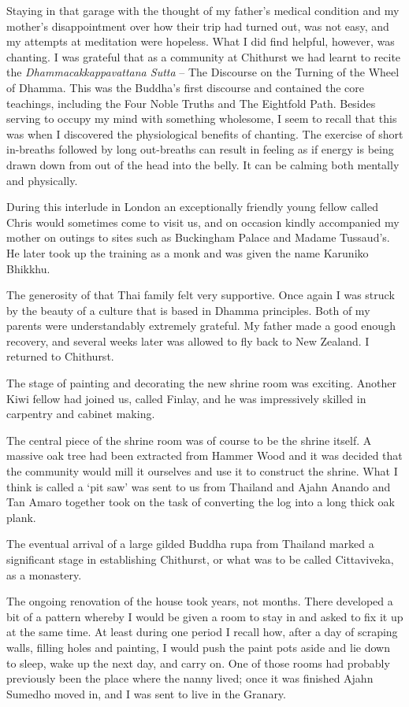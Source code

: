 Staying in that garage with the thought of my father's medical condition
and my mother's disappointment over how their trip had turned out, was
not easy, and my attempts at meditation were hopeless. What I did find
helpful, however, was chanting. I was grateful that as a community at
Chithurst we had learnt to recite the \emph{Dhammacakkappavattana Sutta}
-- The Discourse on the Turning of the Wheel of Dhamma. This was the
Buddha's first discourse and contained the core teachings, including the
Four Noble Truths and The Eightfold Path. Besides serving to occupy my
mind with something wholesome, I seem to recall that this was when I
discovered the physiological benefits of chanting. The exercise of short
in-breaths followed by long out-breaths can result in feeling as if
energy is being drawn down from out of the head into the belly. It can
be calming both mentally and physically.

During this interlude in London an exceptionally friendly young fellow
called Chris would sometimes come to visit us, and on occasion kindly
accompanied my mother on outings to sites such as Buckingham Palace and
Madame Tussaud's. He later took up the training as a monk and was given
the name Karuniko Bhikkhu.

The generosity of that Thai family felt very supportive. Once again I
was struck by the beauty of a culture that is based in Dhamma
principles. Both of my parents were understandably extremely grateful.
My father made a good enough recovery, and several weeks later was
allowed to fly back to New Zealand. I returned to Chithurst.

The stage of painting and decorating the new shrine room was exciting.
Another Kiwi fellow had joined us, called Finlay, and he was
impressively skilled in carpentry and cabinet making.

The central piece of the shrine room was of course to be the shrine
itself. A massive oak tree had been extracted from Hammer Wood and it
was decided that the community would mill it ourselves and use it to
construct the shrine. What I think is called a `pit saw' was sent to us
from Thailand and Ajahn Anando and Tan Amaro together took on the task
of converting the log into a long thick oak plank.

The eventual arrival of a large gilded Buddha rupa from Thailand marked
a significant stage in establishing Chithurst, or what was to be called
Cittaviveka, as a monastery.

The ongoing renovation of the house took years, not months. There
developed a bit of a pattern whereby I would be given a room to stay in
and asked to fix it up at the same time. At least during one period I
recall how, after a day of scraping walls, filling holes and painting, I
would push the paint pots aside and lie down to sleep, wake up the next
day, and carry on. One of those rooms had probably previously been the
place where the nanny lived; once it was finished Ajahn Sumedho moved
in, and I was sent to live in the Granary.

